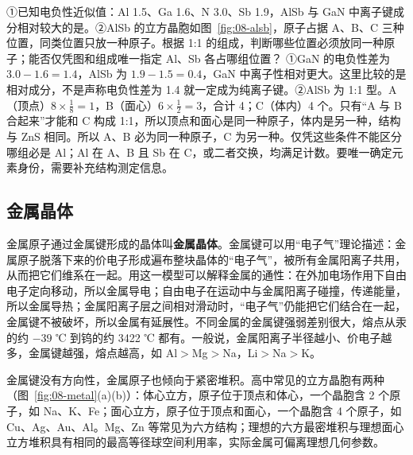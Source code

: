 \begin{liti}[组成与占位组合]
①已知电负性近似值：Al 1.5、Ga 1.6、N 3.0、Sb 1.9，AlSb 与 GaN 中离子键成分相对较大的是\tk。②AlSb 的立方晶胞如图~\ref{fig:08-alsb}，原子占据 A、B、C 三种位置，同类位置只放一种原子。根据 1:1 的组成，判断哪些位置必须放同一种原子；能否仅凭图和组成唯一指定 Al、Sb 各占哪组位置？
\tcblower
\jie ①GaN 的电负性差为 $3.0-1.6=1.4$，AlSb 为 $1.9-1.5=0.4$，GaN 中离子性相对更大。这里比较的是相对成分，不是声称电负性差为 1.4 就一定成为纯离子键。②AlSb 为 1:1 型。A（顶点）$8\times\frac18=1$，B（面心）$6\times\frac12=3$，合计 4；C（体内）4 个。只有“A 与 B 合起来”才能和 C 构成 1:1，所以顶点和面心是同一种原子，体内是另一种，结构与 ZnS 相同。所以 A、B 必为同一种原子，C 为另一种。仅凭这些条件不能区分哪组必是 Al；Al 在 A、B 且 Sb 在 C，或二者交换，均满足计数。要唯一确定元素身份，需要补充结构测定信息。
\end{liti}

\subsection{金属晶体}

金属原子通过金属键形成的晶体叫\textbf{金属晶体}。金属键可以用“电子气”理论描述：金属原子脱落下来的价电子形成遍布整块晶体的“电子气”，被所有金属阳离子共用，从而把它们维系在一起。用这一模型可以解释金属的通性：在外加电场作用下自由电子定向移动，所以金属导电；自由电子在运动中与金属阳离子碰撞，传递能量，所以金属导热；金属阳离子层之间相对滑动时，“电子气”仍能把它们结合在一起，金属键不被破坏，所以金属有延展性。不同金属的金属键强弱差别很大，熔点从汞的约 $-39$ ℃ 到钨的约 3422 ℃ 都有。一般说，金属阳离子半径越小、价电子越多，金属键越强，熔点越高，如 Al$>$Mg$>$Na，Li$>$Na$>$K。

金属键没有方向性，金属原子也倾向于紧密堆积。高中常见的立方晶胞有两种（图~\ref{fig:08-metal}(a)(b)）：体心立方，原子位于顶点和体心，一个晶胞含 2 个原子，如 Na、K、Fe；面心立方，原子位于顶点和面心，一个晶胞含 4 个原子，如 Cu、Ag、Au、Al。Mg、Zn 等常见为六方结构；理想的六方最密堆积与理想面心立方堆积具有相同的最高等径球空间利用率，实际金属可偏离理想几何参数。

